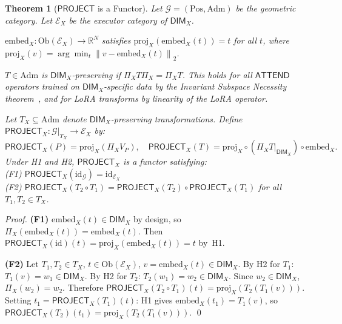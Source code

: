 \documentclass[10pt,twocolumn]{article}
\theoremstyle{plain}
\newtheorem{theorem}{Theorem}[section]
\theoremstyle{definition}
\theoremstyle{remark}
\newcommand{\RR}{\mathbb{R}}
\newcommand{\Project}{\mathsf{PROJECT}}
\newcommand{\Attend}{\mathsf{ATTEND}}
\newcommand{\DimX}{\mathsf{DIM}_X}
\newcommand{\ProxX}{\Pi_X}
\newcommand{\EmbX}{\mathrm{embed}_X}
\newcommand{\ProjX}{\mathrm{proj}_X}
\newcommand{\norm}[1]{\left\|#1\right\|}
\begin{document}
\begin{theorem}[$\Project$ is a Functor]
\label{thm:functor}
Let $\mathcal{G}=(\mathrm{Pos},\mathrm{Adm})$ be the \emph{geometric category}.
Let $\mathcal{E}_X$ be the \emph{executor category} of $\DimX$.

\begin{description}[leftmargin=1.5em,noitemsep]
\item[\textbf{H1}] $\EmbX\colon\mathrm{Ob}(\mathcal{E}_X)\to\RR^N$ satisfies
  $\ProjX(\EmbX(t))=t$ for all $t$, where
  $\ProjX(v)=\arg\min_t\norm{v-\EmbX(t)}_2$.
\item[\textbf{H2}] $T\in\mathrm{Adm}$ is $\DimX$-\emph{preserving} if
  $\ProxX T\ProxX=\ProxX T$. This holds for all $\Attend$ operators trained
  on $\DimX$-specific data by the Invariant Subspace Necessity theorem~\textnormal{\citep{suarez2026invariant}},
  and for LoRA transforms by linearity of the LoRA operator.
\end{description}

Let $T_X\subseteq\mathrm{Adm}$ denote $\DimX$-preserving transformations.
Define $\Project_X\colon\mathcal{G}|_{T_X}\to\mathcal{E}_X$ by:
\[
  \Project_X(P)=\ProjX(\ProxX V_P),\quad
  \Project_X(T)=\ProjX\circ(\ProxX T|_{\DimX})\circ\EmbX.
\]
Under H1 and H2, $\Project_X$ is a functor satisfying:\\
\textnormal{(F1)} $\Project_X(\mathrm{id}_\mathcal{G})=\mathrm{id}_{\mathcal{E}_X}$\\
\textnormal{(F2)} $\Project_X(T_2\circ T_1)=\Project_X(T_2)\circ\Project_X(T_1)$
  for all $T_1,T_2\in T_X$.
\end{theorem}

\begin{proof}
\textbf{(F1)} $\EmbX(t)\in\DimX$ by design, so $\ProxX(\EmbX(t))=\EmbX(t)$.
Then $\Project_X(\mathrm{id})(t)=\ProjX(\EmbX(t))=t$ by~H1.

\textbf{(F2)} Let $T_1,T_2\in T_X$, $t\in\mathrm{Ob}(\mathcal{E}_X)$,
$v=\EmbX(t)\in\DimX$.
By H2 for $T_1$: $T_1(v)=w_1\in\DimX$. By H2 for $T_2$:
$T_2(w_1)=w_2\in\DimX$. Since $w_2\in\DimX$, $\ProxX(w_2)=w_2$.
Therefore $\Project_X(T_2\circ T_1)(t)=\ProjX(T_2(T_1(v)))$.
Setting $t_1=\Project_X(T_1)(t)$: H1 gives $\EmbX(t_1)=T_1(v)$,
so $\Project_X(T_2)(t_1)=\ProjX(T_2(T_1(v)))$. \qed
\end{proof}
\end{document}
